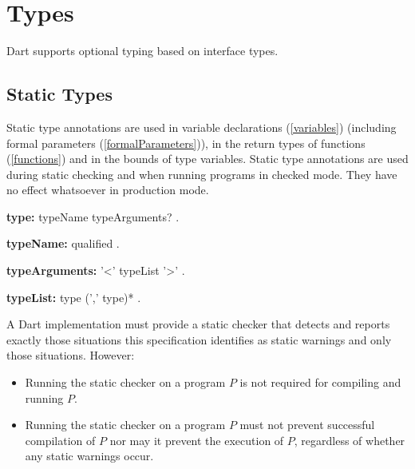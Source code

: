 \documentclass{article}
\begin{document}


\section{Types}

\LMHash{}
Dart supports optional typing based on interface types.


\subsection{Static Types}

\LMHash{}
Static type annotations are used in variable declarations (\ref{variables}) (including formal parameters (\ref{formalParameters})), in the return types of functions (\ref{functions}) and in the bounds of type variables.  Static type annotations are used during static  checking and when running programs in checked mode. They have no effect whatsoever in production mode.

 \begin{grammar}
{\bf type:}
      typeName typeArguments?
    .

{\bf typeName:}
      qualified 
    .

{\bf typeArguments:}
      '<' typeList '>'
    .

{\bf typeList:}
      type (',' type)*
    .
 \end{grammar}

\LMHash{}
A Dart implementation must provide a static checker that detects and reports exactly those situations this specification identifies as static warnings and only those situations. However:
\begin{itemize}
\item Running  the static checker on a program $P$ is not required for compiling and running $P$.  
\item Running the static checker on a program $P$ must not prevent successful compilation of $P$ nor may it prevent the execution of $P$, regardless of whether any static warnings occur.
\end{itemize}
\end{document}

